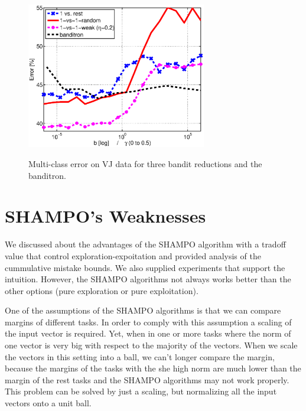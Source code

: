 \begin{figure}[!ht]
\begin{centering}
\includegraphics[width=0.7\textwidth]{figs/VJ_three_methods.eps}\label{fig:mc_vj}
\caption{Multi-class error on VJ data for three bandit reductions and the banditron.}
\end{centering}
\end{figure}

\section{SHAMPO's Weaknesses}
We discussed about the advantages of the SHAMPO algorithm with a tradoff value that control 
exploration-expoitation and  provided analysis of the cummulative mistake 
bounds. We also supplied experiments that support the intuition.  However, the 
SHAMPO algorithms not always works better than the other options (pure exploration or pure 
exploitation). 

One of the assumptions of  the SHAMPO algorithms is that we can 
compare margins of different tasks. In order to comply with this  assumption 
a scaling of the input vector is required. Yet, when in one or more tasks 
where  the norm of one vector is very big with respect to the majority of the 
vectors. When we scale the vectors in this setting into a ball, we can't longer compare the 
margin, because the margins of the tasks with the she high  norm are much lower 
than the margin of the rest tasks and the SHAMPO algorithms may not work properly. 
This problem can be solved by just a scaling, but normalizing all the input 
vectors onto a unit ball.


